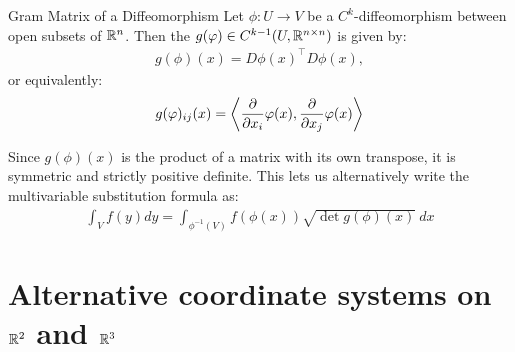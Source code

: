 \begin{importantdefinition}{Gram Matrix of a Diffeomorphism}{}
	Let $\phi : U \to V$ be a $C^k$-diffeomorphism between open subsets of $\mathbb{R}^n$. Then the  $g(\varphi) \in C^{k-1}(U, \mathbb{R}^{n \times n})$ is given by:
	\begin{align*}
		g(\phi)(x) = D\phi(x)^\top D\phi(x),
	\end{align*}
	or equivalently:
	\begin{align*}
		g(\varphi)_{ij}(x) = \left\langle \pdv{x_i}\varphi(x), \pdv{x_j}\varphi(x) \right\rangle
	\end{align*}
\end{importantdefinition}
Since $g(\phi)(x)$ is the product of a matrix with its own transpose, it is symmetric and strictly positive definite. This lets us alternatively write the multivariable substitution formula as:
\begin{align*}
	\int_V f(y) dy = \int_{\phi^{-1}(V)} f(\phi(x)) \sqrt{\det g(\phi)(x)} ~dx
\end{align*}

\clearpage

\section{Alternative coordinate systems on $\mathbb{R}^2$ and $\mathbb{R}^3$}
